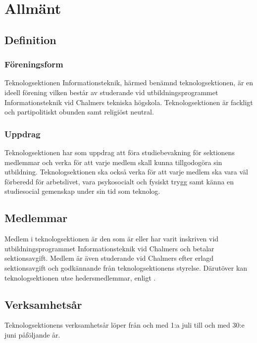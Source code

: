 \section{Allmänt}

\subsection{Definition}

\subsubsection{Föreningsform}
Teknologsektionen Informationsteknik, härmed benämnd teknologsektionen, är en ideell förening vilken består av studerande vid utbildningsprogrammet Informationsteknik vid Chalmers tekniska högskola. Teknologsektionen är fackligt och partipolitiskt obunden samt religiöst neutral.

\subsubsection{Uppdrag}
Teknologsektionen har som uppdrag att föra studiebevakning för
sektionens medlemmar och verka för att varje medlem skall kunna tillgodogöra sin utbildning. Teknologsektionen ska också verka för att varje medlem ska vara väl förberedd för arbetslivet, vara psykosocialt och fysiskt trygg samt känna en
studiesocial gemenskap under sin tid som teknolog.

\subsection{Medlemmar}

Medlem i teknologsektionen är den som är eller har varit inskriven vid utbildningsprogrammet Informationsteknik vid Chalmers och betalar sektionsavgift. Medlem är även studerande vid Chalmers efter erlagd sektionsavgift och godkännande från teknologsektionens styrelse. Därutöver kan teknologsektionen utse hedersmedlemmar, enligt .

\subsection{Verksamhetsår}
Teknologsektionens verksamhetsår löper från och med 1:a juli till och med 30:e juni påföljande år.
